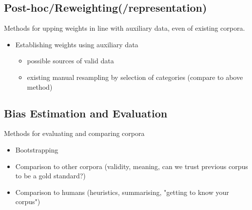 \subsection{Post-hoc/Reweighting(/representation)}
Methods for upping weights in line with auxiliary data, even of existing corpora.

\begin{itemize}
    \item Establishing weights using auxiliary data
    \begin{itemize}
        \item possible sources of valid data
        \item existing manual resampling by selection of categories (compare to above method)
    \end{itemize}
\end{itemize}












\subsection{Bias Estimation and Evaluation}
Methods for evaluating and comparing corpora


\begin{itemize}
    \item Bootstrapping
    \item Comparison to other corpora (validity, meaning, can we trust previous corpus to be a gold standard?)
    \item Comparison to humans (heuristics, summarising, "getting to know your corpus")
\end{itemize}






